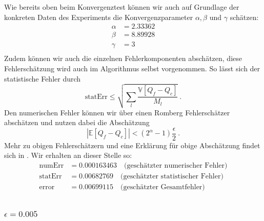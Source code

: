 Wie bereits oben beim Konvergenztest können wir auch auf Grundlage der konkreten Daten des Experiments die Konvergenzparameter $ \alpha, \beta $ und  $ \gamma $ schätzen:
\begin{align*}
\alpha  &=     2.33362   \\
\beta   &=    8.89928   \\
\gamma  &=    3  \\
\end{align*}
Zudem können wir auch die einzelnen Fehlerkomponenten abschätzen, diese Fehlerschätzung wird auch im Algorithmus selbst vorgenommen. So lässt sich der statistische Fehler durch \[
\text{statErr} \leq \sqrt{\sum_l   \frac{\mathbb{V}[Q_f-Q_c]}{M_l}} \ . \] 
Den numerischen Fehler können wir über einen Romberg Fehlerschätzer abschätzen und nutzen dabei die Abschätzung \[ \left| \mathbb{E}[Q_f-Q_c] \right| < (2^{\alpha}-1)\frac{\epsilon}{2} \ . \] Mehr zu obigen Fehlerschätzern und eine Erklärung für obige Abschätzung findet sich in \cite{giles_2015}.
Wir erhalten an dieser Stelle so: 
\begin{align*}
\text{numErr}  &=  0.000163463   \quad \text{(geschätzter numerischer Fehler)}\\
\text{statErr} &= 0.00682769  \quad  \text{(geschätzter statistischer Fehler)}\\
\text{error}   &= 0.00699115   \quad  \text{(geschätzter Gesamtfehler)}\\
\end{align*}


\subsubsection{$ \epsilon=0.005 $}

